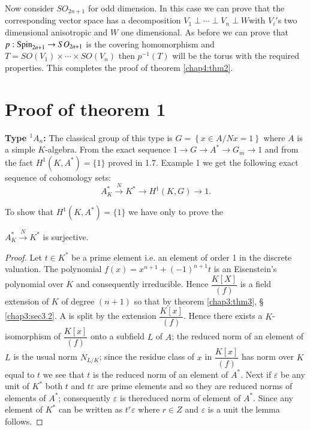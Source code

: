 Now consider $SO_{2n+1}$ for odd dimension. In this case we can prove
that the corresponding vector space has a decomposition  $V_1 \perp
\cdots \perp V_n \perp W$\pageoriginale with $V_i'$s two dimensional
anisotropic and $W$ one dimensional. As before we can prove that $p:
\operatorname{Spin}_{2n+1} \to SO_{2n +1}$ is the covering homomorphism and $T =
SO(V_1) \times \cdots \times SO(V_n)$ then $p^{-1}(T)$ will be the
torus with the required properties. This completes the proof of
theorem \ref{chap4:thm2}.  

\section{Proof of theorem 1}\label{chap4:sec4.3}

\medskip\noindent
{\bf Type {\boldmath${}^1 A_n $:}} The classical group of this type is $G = \left\{ x
\in A/Nx = 1 \right\}$ where $A$ is a simple $K$-algebra. From the exact
sequence $1 \to G \to A^* \to G_m \to 1$ and from the fact $H^1
(K,A^*) = \{ 1 \}$ proved in 1.7. Example 1 we get the
following exact sequence of cohomology sets:  
$$
A^*_K \overset{N}{\to} K^* \to H^1(K,G) \to 1.
$$

To show that $H^1 (K,A^*) = \{ 1 \}$ we have only to prove the  




\setcounter{lem}{0}
\begin{lem}%
$A^*_K \overset{N}{\to} K^*$ is surjective.
\end{lem}

\begin{proof}
Let $t \in K^*$ be a prime element i.e. an element of order 1 in the
discrete valuation. The polynomial $f (x) = x^{n+1}+ (-1)^{n+1}t$ is
an Eisenstein's polynomial over $K$ and consequently irreducible. 
Hence $\dfrac {K[X]}{(f)}$ is a field extension of $K$ of degree
$(n+1)$ so that by theorem \ref{chap3:thm3}, \S
\ref{chap3:sec3.2}. A is split by the extension 
$\dfrac {K[x]}{(f)}$. Hence there exists a $K$-isomorphism of $\dfrac
{K[x]}{(f)}$ onto a subfield  $L$ of $A$; the reduced norm of an
element of $L$ is the usual norm $N_{L/K}$; since the residue class of
$x$ in $\dfrac {K[x]}{(f)}$ has norm over $K$ equal to $t$ we see that
$t$ is the reduced norm of an element of $A^*$. Next if $\varepsilon $ be any
unit of $K^*$ both $t$ and $t \varepsilon $ are prime elements and so they are
reduced norms of elements of $A^*$; consequently $\varepsilon $ is
the\pageoriginale reduced norm of element of $A^*$. Since any element
of $K^*$ can be written as $t^r \varepsilon$ where $r \in Z$ and
$\varepsilon$ is a unit the lemma follows. 
\end{proof}

